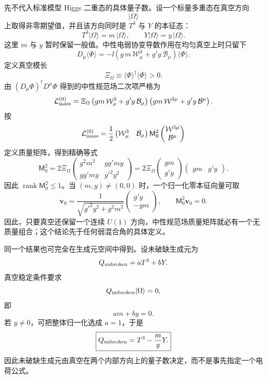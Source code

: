 \begin{derivation}

先不代入标准模型 Higgs 二重态的具体量子数。设一个标量多重态在真空方向
\[
|\Omega\rangle
\]
上取得非零期望值，并且该方向同时是 \(T^3\) 与 \(Y\) 的本征态：
\[
T^3|\Omega\rangle
=
m\,|\Omega\rangle,
\qquad
Y|\Omega\rangle
=
y\,|\Omega\rangle.
\]
这里 \(m\) 与 \(y\) 暂时保留一般值。中性电弱协变导数作用在均匀真空上时只留下
\[
D_\mu\langle\Phi\rangle
=
-\ii
\left(
g\,m\,\mathcal W_\mu^3
+
g' y\,\mathcal B_\mu
\right)
\langle\Phi\rangle.
\]
定义真空模长
\[
\Xi_\Omega\equiv
\langle\Phi\rangle^\dagger\langle\Phi\rangle>0.
\]
由
\(
(D_\mu\Phi)^\dagger D^\mu\Phi
\)
得到的中性规范场二次项严格为
\[
\mathcal L_{\rm mass}^{(0)}
=\Xi_\Omega
\left(
gm\,\mathcal W_\mu^3+g'y\,\mathcal B_\mu
\right)
\left(
gm\,\mathcal W^{3\mu}+g'y\,\mathcal B^\mu
\right).
\]
按
\[
\mathcal L_{\rm mass}^{(0)}
=\frac12
\begin{pmatrix}\mathcal W_\mu^3&\mathcal B_\mu\end{pmatrix}
\mathsf M_0^2
\begin{pmatrix}\mathcal W^{3\mu}\\\mathcal B^\mu\end{pmatrix}
\]
定义质量矩阵，得到精确等式
\[
\mathsf M_0^2
=2\Xi_\Omega
\begin{pmatrix}
g^2m^2 & gg'my\\
gg'my & g'^2y^2
\end{pmatrix}
=2\Xi_\Omega
\begin{pmatrix}gm\\ g'y\end{pmatrix}
\begin{pmatrix}gm & g'y\end{pmatrix}.
\]
因此 $\operatorname{rank}\mathsf M_0^2\le1$。当 $(m,y)\neq(0,0)$ 时，一个归一化零本征向量可取
\[
\mathbf v_0
=\frac1{\sqrt{g'^2y^2+g^2m^2}}
\begin{pmatrix}
g'y\\-gm
\end{pmatrix},
\qquad
\mathsf M_0^2\mathbf v_0=0.
\]
因此，只要真空还保留一个连续 \(U(1)\) 方向，中性规范场质量矩阵就必有一个无质量组合；这个结论先于任何弱混合角的具体定义。

同一个结果也可完全在生成元空间中得到。设未破缺生成元为
\[
Q_{\rm unbroken}
=
aT^3+bY.
\]
真空稳定条件要求
\[
Q_{\rm unbroken}|\Omega\rangle=0,
\]
即
\[
am+by=0.
\]
若 \(y\neq0\)，可把整体归一化选成 \(a=1\)，于是
\[
\boxed{
Q_{\rm unbroken}
=
T^3-\frac{m}{y}Y.
}
\]
因此未破缺生成元由真空在两个内部方向上的量子数决定，而不是事先指定一个电荷公式。


\end{derivation}
